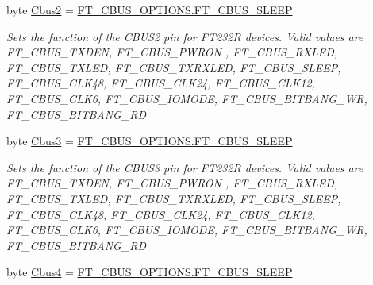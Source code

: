 \begin{DoxyCompactItemize}
byte \mbox{\hyperlink{class_f_t_d2_x_x___n_e_t_1_1_f_t_d_i_1_1_f_t232_r___e_e_p_r_o_m___s_t_r_u_c_t_u_r_e_ad20d3483171cc4380be5ed4ce5d414db}{Cbus2}} = \mbox{\hyperlink{class_f_t_d2_x_x___n_e_t_1_1_f_t_d_i_1_1_f_t___c_b_u_s___o_p_t_i_o_n_s_a12ffdb96c52abef0df44530b144b0a80}{F\+T\+\_\+\+C\+B\+U\+S\+\_\+\+O\+P\+T\+I\+O\+N\+S.\+F\+T\+\_\+\+C\+B\+U\+S\+\_\+\+S\+L\+E\+EP}}
\begin{DoxyCompactList}\small\item\em Sets the function of the C\+B\+U\+S2 pin for F\+T232R devices. Valid values are F\+T\+\_\+\+C\+B\+U\+S\+\_\+\+T\+X\+D\+EN, F\+T\+\_\+\+C\+B\+U\+S\+\_\+\+P\+W\+R\+ON , F\+T\+\_\+\+C\+B\+U\+S\+\_\+\+R\+X\+L\+ED, F\+T\+\_\+\+C\+B\+U\+S\+\_\+\+T\+X\+L\+ED, F\+T\+\_\+\+C\+B\+U\+S\+\_\+\+T\+X\+R\+X\+L\+ED, F\+T\+\_\+\+C\+B\+U\+S\+\_\+\+S\+L\+E\+EP, F\+T\+\_\+\+C\+B\+U\+S\+\_\+\+C\+L\+K48, F\+T\+\_\+\+C\+B\+U\+S\+\_\+\+C\+L\+K24, F\+T\+\_\+\+C\+B\+U\+S\+\_\+\+C\+L\+K12, F\+T\+\_\+\+C\+B\+U\+S\+\_\+\+C\+L\+K6, F\+T\+\_\+\+C\+B\+U\+S\+\_\+\+I\+O\+M\+O\+DE, F\+T\+\_\+\+C\+B\+U\+S\+\_\+\+B\+I\+T\+B\+A\+N\+G\+\_\+\+WR, F\+T\+\_\+\+C\+B\+U\+S\+\_\+\+B\+I\+T\+B\+A\+N\+G\+\_\+\+RD \end{DoxyCompactList}\item 
byte \mbox{\hyperlink{class_f_t_d2_x_x___n_e_t_1_1_f_t_d_i_1_1_f_t232_r___e_e_p_r_o_m___s_t_r_u_c_t_u_r_e_a9573c46f9faa3c896443396b170ed24b}{Cbus3}} = \mbox{\hyperlink{class_f_t_d2_x_x___n_e_t_1_1_f_t_d_i_1_1_f_t___c_b_u_s___o_p_t_i_o_n_s_a12ffdb96c52abef0df44530b144b0a80}{F\+T\+\_\+\+C\+B\+U\+S\+\_\+\+O\+P\+T\+I\+O\+N\+S.\+F\+T\+\_\+\+C\+B\+U\+S\+\_\+\+S\+L\+E\+EP}}
\begin{DoxyCompactList}\small\item\em Sets the function of the C\+B\+U\+S3 pin for F\+T232R devices. Valid values are F\+T\+\_\+\+C\+B\+U\+S\+\_\+\+T\+X\+D\+EN, F\+T\+\_\+\+C\+B\+U\+S\+\_\+\+P\+W\+R\+ON , F\+T\+\_\+\+C\+B\+U\+S\+\_\+\+R\+X\+L\+ED, F\+T\+\_\+\+C\+B\+U\+S\+\_\+\+T\+X\+L\+ED, F\+T\+\_\+\+C\+B\+U\+S\+\_\+\+T\+X\+R\+X\+L\+ED, F\+T\+\_\+\+C\+B\+U\+S\+\_\+\+S\+L\+E\+EP, F\+T\+\_\+\+C\+B\+U\+S\+\_\+\+C\+L\+K48, F\+T\+\_\+\+C\+B\+U\+S\+\_\+\+C\+L\+K24, F\+T\+\_\+\+C\+B\+U\+S\+\_\+\+C\+L\+K12, F\+T\+\_\+\+C\+B\+U\+S\+\_\+\+C\+L\+K6, F\+T\+\_\+\+C\+B\+U\+S\+\_\+\+I\+O\+M\+O\+DE, F\+T\+\_\+\+C\+B\+U\+S\+\_\+\+B\+I\+T\+B\+A\+N\+G\+\_\+\+WR, F\+T\+\_\+\+C\+B\+U\+S\+\_\+\+B\+I\+T\+B\+A\+N\+G\+\_\+\+RD \end{DoxyCompactList}\item 
byte \mbox{\hyperlink{class_f_t_d2_x_x___n_e_t_1_1_f_t_d_i_1_1_f_t232_r___e_e_p_r_o_m___s_t_r_u_c_t_u_r_e_a0230796106223815a81b65d1940dcadd}{Cbus4}} = \mbox{\hyperlink{class_f_t_d2_x_x___n_e_t_1_1_f_t_d_i_1_1_f_t___c_b_u_s___o_p_t_i_o_n_s_a12ffdb96c52abef0df44530b144b0a80}{F\+T\+\_\+\+C\+B\+U\+S\+\_\+\+O\+P\+T\+I\+O\+N\+S.\+F\+T\+\_\+\+C\+B\+U\+S\+\_\+\+S\+L\+E\+EP}}

\end{DoxyCompactItemize}
